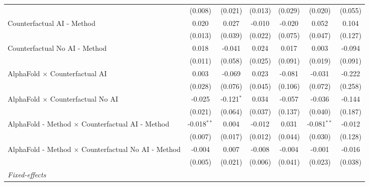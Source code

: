 \begin{tabular}{lcccccc}
                                                              & (0.008)       & (0.021)       & (0.013)       & (0.029)      & (0.020)       & (0.055)\\   
   Counterfactual AI - Method                                 & 0.020         & 0.027         & -0.010        & -0.020       & 0.052         & 0.104\\   
                                                              & (0.013)       & (0.039)       & (0.022)       & (0.075)      & (0.047)       & (0.127)\\   
   Counterfactual No AI - Method                              & 0.018         & -0.041        & 0.024         & 0.017        & 0.003         & -0.094\\   
                                                              & (0.011)       & (0.058)       & (0.025)       & (0.091)      & (0.019)       & (0.091)\\   
   AlphaFold $\times$ Counterfactual AI                       & 0.003         & -0.069        & 0.023         & -0.081       & -0.031        & -0.222\\   
                                                              & (0.028)       & (0.076)       & (0.045)       & (0.106)      & (0.072)       & (0.258)\\   
   AlphaFold $\times$ Counterfactual No AI                    & -0.025        & -0.121$^{*}$  & 0.034         & -0.057       & -0.036        & -0.144\\   
                                                              & (0.021)       & (0.064)       & (0.037)       & (0.137)      & (0.040)       & (0.187)\\   
   AlphaFold - Method $\times$ Counterfactual AI - Method     & -0.018$^{**}$ & 0.004         & -0.012        & 0.031        & -0.081$^{**}$ & -0.012\\   
                                                              & (0.007)       & (0.017)       & (0.012)       & (0.044)      & (0.030)       & (0.128)\\   
   AlphaFold - Method $\times$ Counterfactual No AI - Method  & -0.004        & 0.007         & -0.008        & -0.004       & -0.001        & -0.016\\   
                                                              & (0.005)       & (0.021)       & (0.006)       & (0.041)      & (0.023)       & (0.038)\\   
   \midrule
   \emph{Fixed-effects}\\

\end{tabular}
